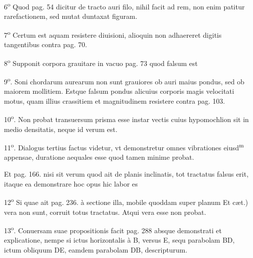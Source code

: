 \documentclass[11pt,a4paper]{article}
\begin{document}
6\textsuperscript{o} Quod pag. 54 dicitur de tracto auri filo, nihil facit ad rem, non enim patitur rarefactionem, sed mutat duntaxat figuram.

7\textsuperscript{o} Certum est aquam resistere diuisioni, alioquin non adhaereret digitis tangentibus contra pag. 70.

8\textsuperscript{o} Supponit corpora grauitare in vacuo pag. 73 quod falsum est

9\textsuperscript{o}. Soni chordarum aurearum non sunt grauiores ob auri maius pondus, sed ob maiorem mollitiem. Estque falsum pondus alicuius corporis magis velocitati motus, quam illius crassitiem et magnitudinem resistere contra pag. 103.

10\textsuperscript{o}. Non probat transuersum prisma esse instar vectis cuius hypomochlion sit in medio densitatis, neque id verum est.

11\textsuperscript{o}. Dialogus tertius factus videtur, vt demonstretur omnes vibrationes eiusd\textsuperscript{m} appensae, duratione aequales esse quod tamen minime probat.


Et pag. 166. nisi sit verum quod ait de planis inclinatis, tot tractatus falsus erit, itaque ea demonstrare hoc opus hic labor es

12\textsuperscript{o} Si quae ait pag. 236. à sectione illa, mobile quoddam super planum Et cæt.) vera non sunt, corruit totus tractatus. Atqui vera esse non probat.

13\textsuperscript{o}. Conuersam suae propositionis facit pag. 288 absque demonstrati et explicatione, nempe si ictus horizontalis à B, versus E, sequ\ill{} parabolam BD, ictum obliquum DE, eamdem parabolam DB, descripturum.
\end{document}

